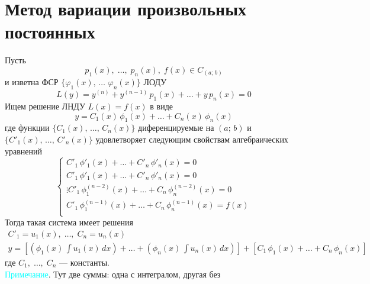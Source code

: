 \author{Tkachuk Andrei}

\section{Метод вариации произвольных постоянных}

\begin{Th}
    Пусть 
    \[
        p_1(x),\; \dots,\; p_n(x),\; f(x) \in C_{(a;\,b)}
    \]
    и изветна ФСР $\{\varphi_1(x),\, \dots\,\, \varphi_n(x)\}$ ЛОДУ
    \[
        L(y) = y^{(n)} + y^{(n-1)}\,p_1(x) + \dots + y\,p_n(x) = 0
    \]
    Ищем решение ЛНДУ $L(x) = f(x)$ в виде 
    \[
        y = C_1(x)\,\phi_1(x) + \dots + C_n(x)\,\phi_n(x)
    \]
    где функции $\{C_1(x),\, \dots,\, C_n(x)\}$ диференцируемые на $(a;\, b)$
    и $\{C'_1(x),\, \dots,\, C'_n(x)\}$ удовлетворяет следующим свойствам алгебраических уравнений
    \[
        \begin{cases}
            C'_1\,\phi'_1(x) + \dots + C'_n\,\phi'_n(x) = 0\\
            C'_1\,\phi'_1(x) + \dots + C'_n\,\phi'_n(x) = 0\\
            \vdots
            C'_1\,\phi^{(n-2)}_1(x) + \dots + C_n\,\phi^{(n-2)}_n(x) = 0\\
            C'_1\,\phi^{(n-1)}_1(x) + \dots + C_n\,\phi^{(n-1)}_n(x) = f(x)\\
        \end{cases}
    \]
    Тогда такая система имеет решения
    \begin{gather*}
        C'_1 = u_1(x),\; \dots,\; C_n = u_n(x)\\
        y = \left[\left(\phi_1(x)\, \int u_1(x)\,dx \right) + \dots + \left( \phi_n(x)\, \int u_n(x)\,dx \right) \right] + \left[C_1\,\phi_1(x) + \dots + C_n\,\phi_n(x)\right]
    \end{gather*}
    где $C_1,\; \dots,\; C_n$ --- константы.\\
    \textcolor{cyan}{Примечание}. Тут две суммы: одна с интегралом, другая без
\end{Th}

